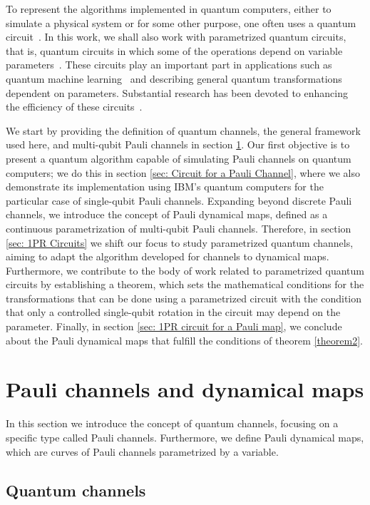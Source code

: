 \documentclass[10pt,letterpaper]{article} %
\begin{document}
To represent the algorithms implemented in quantum computers, either to
simulate a physical system or for some other purpose, one often uses a quantum
circuit~\cite{chuangbook}.  In this work, we shall also work with parametrized
quantum circuits, that is,  quantum circuits in which some of the operations
depend on variable parameters~\cite{cerezo}.  These circuits play an important
part in applications such as quantum machine learning~\cite{Benedetti} and
describing general quantum transformations dependent on parameters. Substantial
research has been devoted to enhancing the efficiency of these
circuits~\cite{Rasmussen}. 

We start by providing the definition of quantum channels, the general framework
used here, and multi-qubit Pauli channels in section \ref{sec: Pauli Channels}.
Our first objective is to present a quantum algorithm capable of simulating
Pauli channels on quantum computers; we do this in section \ref{sec: Circuit
for a Pauli Channel}, where we also demonstrate its implementation using IBM's
quantum computers for the particular case of single-qubit Pauli channels. 
Expanding beyond discrete Pauli channels, we introduce the concept of Pauli
dynamical maps, defined as a continuous parametrization of multi-qubit Pauli
channels.  Therefore, in section \ref{sec: 1PR Circuits} we shift our focus to
study parametrized quantum channels, aiming to adapt the algorithm developed
for channels to dynamical maps.  Furthermore, we contribute to the body of work
related to parametrized quantum circuits by establishing a theorem,
which  sets the mathematical conditions for the transformations
that can be done using a parametrized circuit with the condition that only a
controlled single-qubit
rotation in the circuit may depend on the parameter.  Finally, in
section \ref{sec: 1PR circuit for a Pauli map}, we conclude about the Pauli
dynamical maps that fulfill the conditions of theorem \ref{theorem2}. 

\section{Pauli channels and dynamical maps}  \label{sec: Pauli Channels} %


In this section  we introduce the concept of quantum channels, focusing on a
specific type called Pauli channels.  Furthermore, we define Pauli dynamical
maps, which are curves of Pauli channels parametrized by a variable.
\subsection{Quantum channels} \label{subsec: Quantum Channels} %
\end{document}
